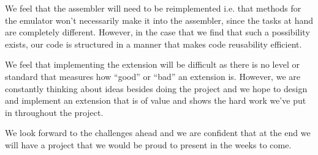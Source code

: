 \documentclass[11pt]{article}
\begin{document}
We feel that the assembler will need to be reimplemented i.e. that methods for the emulator won’t necessarily make it into the assembler, since the tasks at hand are completely different. However, in the case that we find that such a possibility exists, our code is structured in a manner that makes code reusability efficient.

We feel that implementing the extension will be difficult as there is no level or standard that measures how “good” or “bad” an extension is. However, we are constantly thinking about ideas besides doing the project and we hope to design and implement an extension that is of value and shows the hard work we’ve put in throughout the project.

We look forward to the challenges ahead and we are confident that at the end we will have a project that we would be proud to present in the weeks to come.
\end{document}
